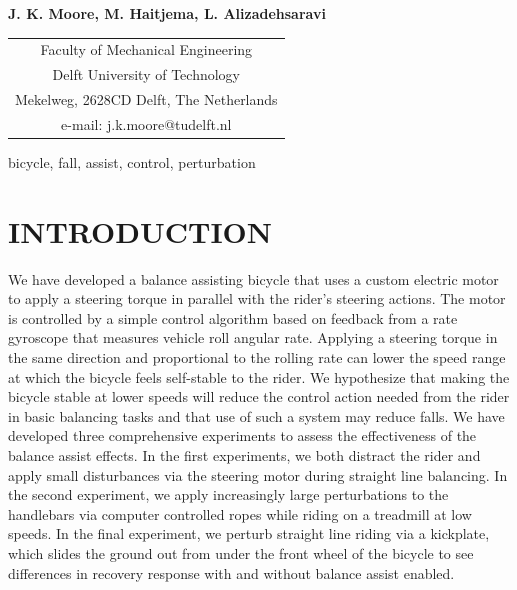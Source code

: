 \documentclass{icsc}
\begin{document}
\begin{center}
\end{center}

\begin{center}
  \normalsize{\bf{J. K. Moore,
                  M. Haitjema,
                  L. Alizadehsaravi}}
\end{center}

\begin{center}
  \begin{tabular}{c}
    Faculty of Mechanical Engineering\\
    Delft University of Technology\\
    Mekelweg, 2628CD Delft, The Netherlands\\
    e-mail: j.k.moore@tudelft.nl\\
  \end{tabular}
\end{center}

\begin{keywords}
  bicycle,
  fall,
  assist,
  control,
  perturbation
\end{keywords}

\section{INTRODUCTION}
%
We have developed a balance assisting bicycle that uses a custom electric motor
to apply a steering torque in parallel with the rider's steering actions. The
motor is controlled by a simple control algorithm based on feedback from a rate
gyroscope that measures vehicle roll angular rate. Applying a steering torque
in the same direction and proportional to the rolling rate can lower the speed
range at which the bicycle feels self-stable to the rider. We hypothesize that
making the bicycle stable at lower speeds will reduce the control action needed
from the rider in basic balancing tasks and that use of such a system may
reduce falls. We have developed three comprehensive experiments to assess the
effectiveness of the balance assist effects. In the first experiments, we both
distract the rider and apply small disturbances via the steering motor during
straight line balancing. In the second experiment, we apply increasingly large
perturbations to the handlebars via computer controlled ropes while riding on a
treadmill at low speeds. In the final experiment, we perturb straight line
riding via a kickplate, which slides the ground out from under the front wheel
of the bicycle to see differences in recovery response with and without balance
assist enabled.
\end{document}
